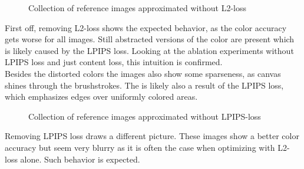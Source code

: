 \begin{figure*}[!htb]
    \caption[]{Collection of reference images approximated without L2-loss}
\end{figure*}
First off, removing L2-loss shows the expected behavior, as the color accuracy gets worse for all images.
Still abstracted versions of the color are present which is likely caused by the LPIPS loss.
Looking at the ablation experiments without LPIPS loss and just content loss, this intuition is confirmed.\\
Besides the distorted colors the images also show some sparseness, as canvas shines through the brushstrokes.
The is likely also a result of the LPIPS loss, which emphasizes edges over uniformly colored areas.

\begin{figure*}[!htb]
    \caption[]{Collection of reference images approximated without LPIPS-loss}
\end{figure*}
Removing LPIPS loss draws a different picture.
These images show a better color accuracy but seem very blurry as it is often the case when optimizing with L2-loss alone.
Such behavior is expected.

